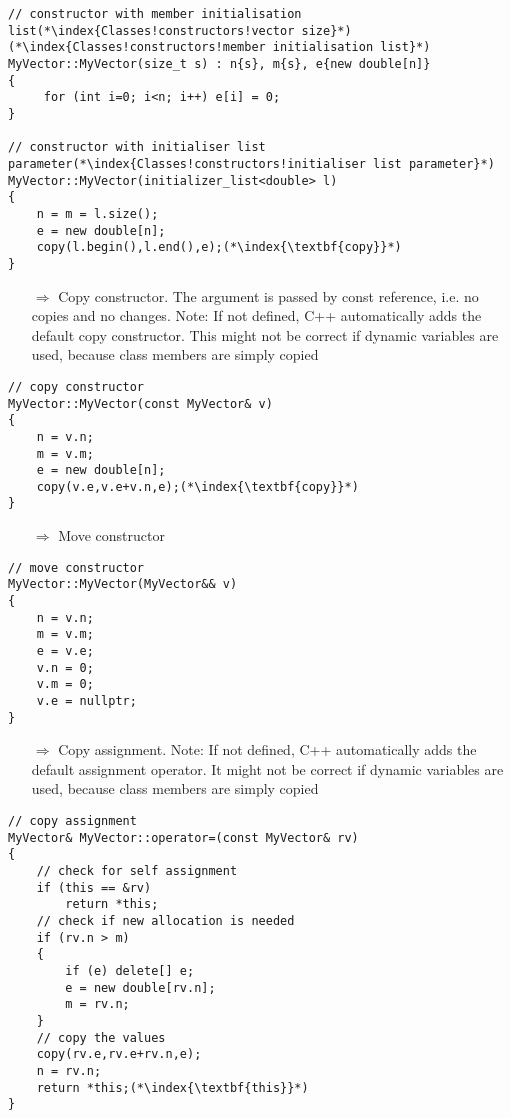 \documentclass[10pt]{article}
\begin{document}
\begin{lstlisting}
// constructor with member initialisation list(*\index{Classes!constructors!vector size}*)(*\index{Classes!constructors!member initialisation list}*)
MyVector::MyVector(size_t s) : n{s}, m{s}, e{new double[n]}
{
     for (int i=0; i<n; i++) e[i] = 0;
}

// constructor with initialiser list parameter(*\index{Classes!constructors!initialiser list parameter}*)
MyVector::MyVector(initializer_list<double> l)
{
    n = m = l.size();
    e = new double[n];
    copy(l.begin(),l.end(),e);(*\index{\textbf{copy}}*)
}
\end{lstlisting}
\begin{enumerate}
\item[$\Rightarrow$] Copy constructor. The argument is passed by const reference, i.e. no copies and no changes. Note: If not defined, C++ automatically adds the default copy
constructor. This might not be correct if dynamic variables are used,
because class members are simply copied
\end{enumerate}
\begin{lstlisting}
// copy constructor
MyVector::MyVector(const MyVector& v)
{
    n = v.n;
    m = v.m;
    e = new double[n];
    copy(v.e,v.e+v.n,e);(*\index{\textbf{copy}}*)
}
\end{lstlisting}
\begin{enumerate}
\item[$\Rightarrow$] Move constructor
\end{enumerate}
\begin{lstlisting}
// move constructor
MyVector::MyVector(MyVector&& v)
{
    n = v.n;
    m = v.m;
    e = v.e;
    v.n = 0;
    v.m = 0;
    v.e = nullptr;
}
\end{lstlisting}
\begin{enumerate}
\item[$\Rightarrow$] Copy assignment. Note: If not defined, C++ automatically adds  the default assignment operator.
It might not be correct if dynamic variables are used,
because class members are simply copied
\end{enumerate}
\begin{lstlisting}
// copy assignment
MyVector& MyVector::operator=(const MyVector& rv)
{
    // check for self assignment
    if (this == &rv)
        return *this;
    // check if new allocation is needed
    if (rv.n > m)
    {
        if (e) delete[] e;
        e = new double[rv.n];
        m = rv.n;
    }
    // copy the values
    copy(rv.e,rv.e+rv.n,e);
    n = rv.n;
    return *this;(*\index{\textbf{this}}*)
}
\end{lstlisting}
\end{document}
